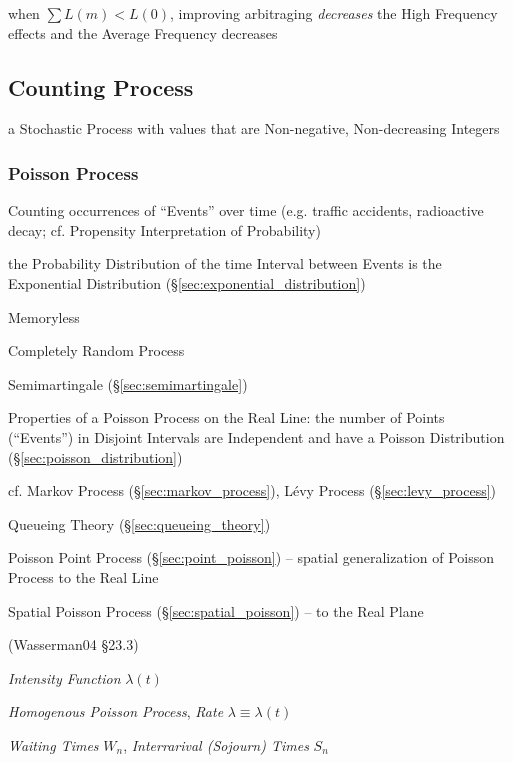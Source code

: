 when $\sum L(m) < L(0)$, improving arbitraging \emph{decreases} the High
Frequency effects and the Average Frequency decreases



\subsection{Counting Process}\label{sec:counting_process}

a Stochastic Process with values that are Non-negative, Non-decreasing Integers



\subsubsection{Poisson Process}\label{sec:poisson_process}

Counting occurrences of ``Events'' over time (e.g. traffic accidents,
radioactive decay; cf. Propensity Interpretation of Probability)

the Probability Distribution of the time Interval between Events is the
Exponential Distribution (\S\ref{sec:exponential_distribution})

Memoryless

Completely Random Process

Semimartingale (\S\ref{sec:semimartingale})

Properties of a Poisson Process on the Real Line: the number of Points
(``Events'') in Disjoint Intervals are Independent and have a Poisson
Distribution (\S\ref{sec:poisson_distribution})

cf. Markov Process (\S\ref{sec:markov_process}), L\'evy Process
(\S\ref{sec:levy_process})

Queueing Theory (\S\ref{sec:queueing_theory})

Poisson Point Process (\S\ref{sec:point_poisson}) -- spatial generalization of
Poisson Process to the Real Line

Spatial Poisson Process (\S\ref{sec:spatial_poisson}) -- to the Real Plane

(Wasserman04 \S 23.3)

\emph{Intensity Function} $\lambda(t)$

\emph{Homogenous Poisson Process}, \emph{Rate} $\lambda \equiv \lambda(t)$

\emph{Waiting Times} $W_n$, \emph{Interrarival (Sojourn) Times} $S_n$


